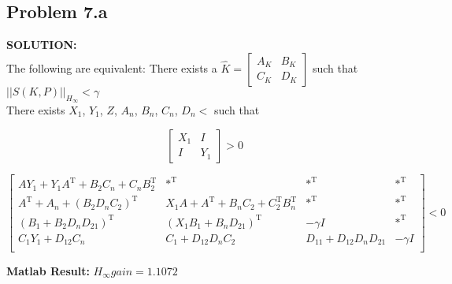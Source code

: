 \documentclass[10pt,a4paper]{article}
\begin{document}
\subsection{Problem 7.a}
\begin{tcolorbox}
\textbf{SOLUTION:}\\
The following are equivalent:
There exists a $\hat{K}=\begin{bmatrix} A_K & B_K \\ C_K & D_K \end{bmatrix}$ such that $||S(K,P)||_{H_{\infty}}<\gamma$\\
There exists $X_1$, $Y_1$, $Z$, $A_n$, $B_n$, $C_n$, $D_n<$ such that

$$\begin{bmatrix} 
X_{1}      & I \\ 
I          & Y_{1}
\end{bmatrix} > 0 
$$

$$\begin{bmatrix} 
AY_{1}+Y_{1}A^{\text{T}}+B_{2}C_{n}+C_{n}B_{2}^{\text{T}}  & *^{\text{T}} & *^{\text{T}} & *^{\text{T}} \\ 
A^{\text{T}}+A_{n}+(B_{2}D_{n}C_{2})^{\text{T}}  & X_{1}A+A^{\text{T}}+B_{n}C_{2}+C_{2}^{\text{T}}B_{n}^{\text{T}} & *^{\text{T}} & *^{\text{T}} \\ 
(B_{1}+B_{2}D_{n}D_{21})^{\text{T}} & (X_{1}B_{1} + B_{n}D_{21})^{\text{T}} & -\gamma I & *^{\text{T}}\\ 
C_{1}Y_{1}+D_{12}C_{n} & C_{1}+D_{12}D_{n}C_{2} & D_{11}+D_{12}D_{n}D_{21} & -\gamma I\\
\end{bmatrix} < 0
$$

\textbf{Matlab Result:}
$H_\infty gain = 1.1072$
\end{tcolorbox}
\end{document}
